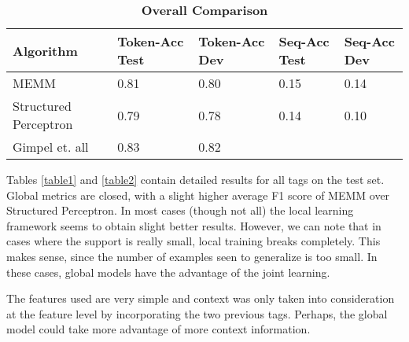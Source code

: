 \documentclass[11pt]{article}
\begin{document}
\begin{table}[htbp]
\centering
    \begin{tabular}{ | l | l | l | l | l |  }
    \hline
    Algorithm & Token-Acc Test & Token-Acc Dev & Seq-Acc Test & Seq-Acc Dev  \\ \hline
    MEMM & 0.81& 0.80 & 0.15 & 0.14  \\ \hline
    Structured Perceptron & 0.79 & 0.78 & 0.14 & 0.10 \\ \hline
    Gimpel et. all  & 0.83 & 0.82 &  ~  & ~  \\
    \hline
    \end{tabular}
       \caption{ \textbf{Overall Comparison }}
\label{table3}
\end{table}

Tables \ref{table1} and \ref{table2} contain detailed results for all tags on the test set. Global metrics are closed, with a slight higher average F1 score of MEMM over Structured Perceptron. In most cases (though not all) the local learning framework seems to obtain slight better results. However, we can note that in cases where the support is really small, local training breaks completely. This makes sense, since the number of examples seen to generalize is too small. In these cases, global models have the advantage of the joint learning. 

The features used are very simple and context was only taken into consideration at the feature level by incorporating the two previous tags. Perhaps, the global model could take more advantage of more context information.  
\end{document}
